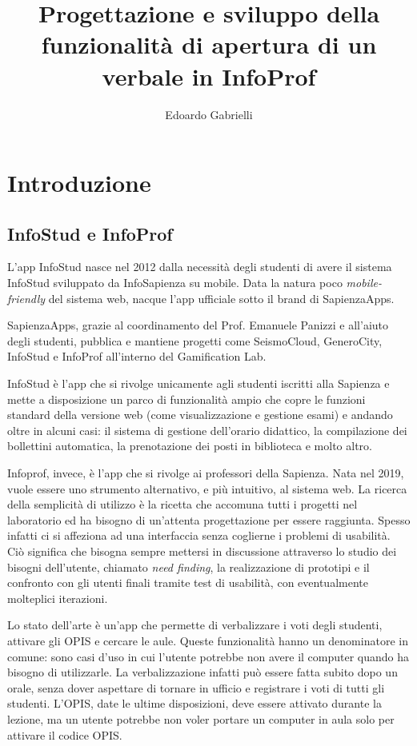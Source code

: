 \documentclass[Lau, oneside, noexaminfo]{sapthesis}%
\title{Progettazione e sviluppo della funzionalità di apertura di un verbale in InfoProf}
\author{Edoardo Gabrielli}
\begin{document}
\frontmatter
\maketitle

\tableofcontents

\mainmatter
\chapter{Introduzione}
\label{ch:1}

\section{InfoStud e InfoProf}
\label{sec:pres}
L'app InfoStud nasce nel 2012 dalla necessità degli studenti di avere il sistema InfoStud sviluppato da InfoSapienza su mobile.
Data la natura poco \textit{mobile-friendly} del sistema web, nacque l'app ufficiale sotto il brand di SapienzaApps.

SapienzaApps, grazie al coordinamento del Prof. Emanuele Panizzi e all'aiuto degli studenti, pubblica e mantiene progetti come SeismoCloud, GeneroCity, InfoStud e InfoProf all'interno del Gamification Lab.

InfoStud è l'app che si rivolge unicamente agli studenti iscritti alla Sapienza e mette a disposizione un parco di funzionalità ampio che copre le funzioni standard della versione web (come visualizzazione e gestione esami) e andando oltre in alcuni casi: il sistema di gestione dell'orario didattico, la compilazione dei bollettini automatica, la prenotazione dei posti in biblioteca e molto altro.

Infoprof, invece, è l'app che si rivolge ai professori della Sapienza. Nata nel 2019, vuole essere uno strumento alternativo, e più intuitivo, al sistema web. La ricerca della semplicità di utilizzo è la ricetta che accomuna tutti i progetti nel laboratorio ed ha bisogno di un'attenta progettazione per essere raggiunta. Spesso infatti ci si affeziona ad una interfaccia senza coglierne i problemi di usabilità. Ciò significa che bisogna sempre mettersi in discussione attraverso lo studio dei bisogni dell'utente, chiamato \textit{need finding}, la realizzazione di prototipi e il confronto con gli utenti finali tramite test di usabilità, con eventualmente molteplici iterazioni.

Lo stato dell'arte è un'app che permette di verbalizzare i voti degli studenti, attivare gli OPIS e cercare le aule. Queste funzionalità hanno un denominatore in comune: sono casi d'uso in cui l'utente potrebbe non avere il computer quando ha bisogno di utilizzarle. La verbalizzazione infatti può essere fatta subito dopo un orale, senza dover aspettare di tornare in ufficio e registrare i voti di tutti gli studenti. L'OPIS, date le ultime disposizioni, deve essere attivato durante la lezione, ma un utente potrebbe non voler portare un computer in aula solo per attivare il codice OPIS.
\end{document}
